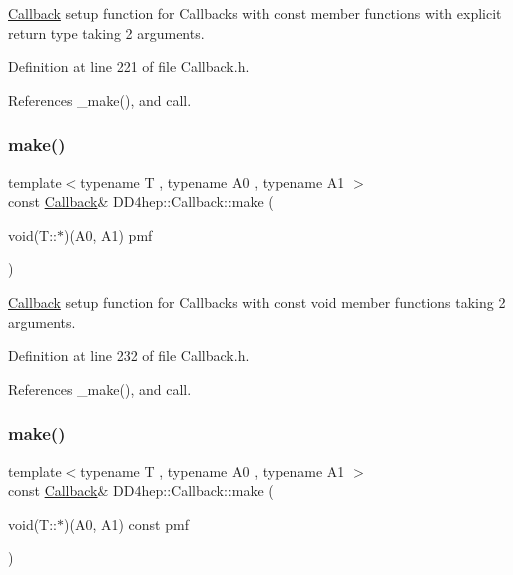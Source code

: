 \hyperlink{class_d_d4hep_1_1_callback}{Callback} setup function for Callbacks with const member functions with explicit return type taking 2 arguments. 



Definition at line 221 of file Callback.\+h.



References \+\_\+make(), and call.

\hypertarget{class_d_d4hep_1_1_callback_ae5896541592022892d7471fc19f9fc41}{}\label{class_d_d4hep_1_1_callback_ae5896541592022892d7471fc19f9fc41} 
\subsubsection{\texorpdfstring{make()}{make()}\hspace{0.1cm}{\footnotesize\ttfamily [11/17]}}
{\footnotesize\ttfamily template$<$typename T , typename A0 , typename A1 $>$ \\
const \hyperlink{class_d_d4hep_1_1_callback}{Callback}\& D\+D4hep\+::\+Callback\+::make (\begin{DoxyParamCaption}\item[{void(T\+::$\ast$)(A0, A1)}]{pmf }\end{DoxyParamCaption})\hspace{0.3cm}{\ttfamily [inline]}}



\hyperlink{class_d_d4hep_1_1_callback}{Callback} setup function for Callbacks with const void member functions taking 2 arguments. 



Definition at line 232 of file Callback.\+h.



References \+\_\+make(), and call.

\hypertarget{class_d_d4hep_1_1_callback_afb5367dfd491fa58cd56d9e96b51a0e3}{}\label{class_d_d4hep_1_1_callback_afb5367dfd491fa58cd56d9e96b51a0e3} 
\subsubsection{\texorpdfstring{make()}{make()}\hspace{0.1cm}{\footnotesize\ttfamily [12/17]}}
{\footnotesize\ttfamily template$<$typename T , typename A0 , typename A1 $>$ \\
const \hyperlink{class_d_d4hep_1_1_callback}{Callback}\& D\+D4hep\+::\+Callback\+::make (\begin{DoxyParamCaption}\item[{void(T\+::$\ast$)(A0, A1) const}]{pmf }\end{DoxyParamCaption})\hspace{0.3cm}{\ttfamily [inline]}}



